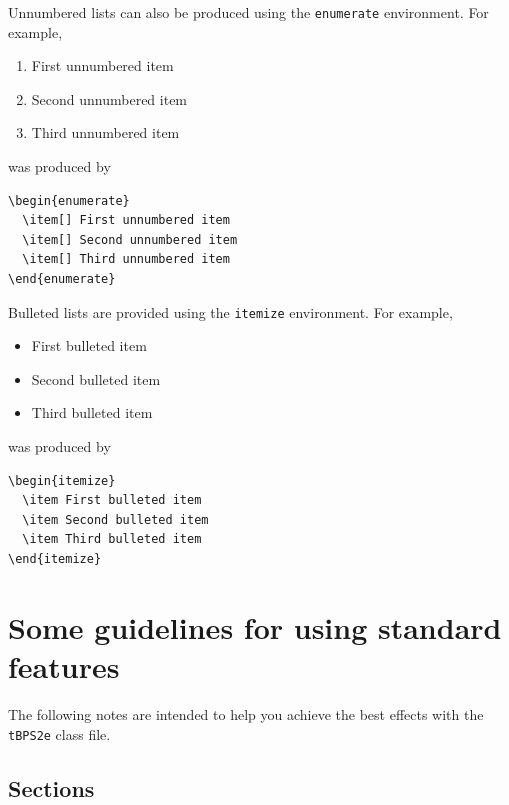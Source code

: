 \documentclass{tBPS2e}
\theoremstyle{plain}
\theoremstyle{definition}
\theoremstyle{remark}
\begin{document}
Unnumbered lists can also be produced using the \texttt{enumerate} environment. For example,
\begin{enumerate}
  \item[] First unnumbered item
  \item[] Second unnumbered item
  \item[] Third unnumbered item
\end{enumerate}
was produced by
\begin{verbatim}
\begin{enumerate}
  \item[] First unnumbered item
  \item[] Second unnumbered item
  \item[] Third unnumbered item
\end{enumerate}
\end{verbatim}

Bulleted lists are provided using the \texttt{itemize} environment. For example,
\begin{itemize}
  \item First bulleted item
  \item Second bulleted item
  \item Third bulleted item
\end{itemize}
was produced by
\begin{verbatim}
\begin{itemize}
  \item First bulleted item
  \item Second bulleted item
  \item Third bulleted item
\end{itemize}
\end{verbatim}


\section{Some guidelines for using standard features}

The following notes are intended to help you achieve the best effects with the \texttt{tBPS2e} class file.


\subsection{Sections}
\end{document}
